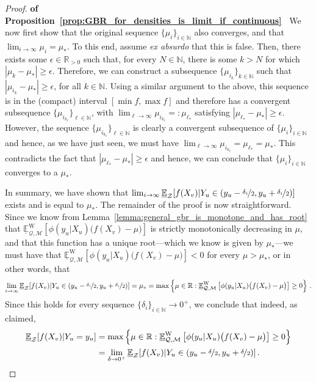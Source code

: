 \documentclass[twoside,11pt]{article}
\newcommand{\nats}{\mathbb{N}}
\newcommand{\reals}{\mathbb{R}}
\newcommand{\realspos}{\reals_{>0}}
\newcommand{\lexp}{\underline{\mathbb{E}}_{\rateset,\mathcal{M}}^\mathrm{W}}
\newcommand{\rateset}{\mathcal{Q}}
\newcommand{\abs}[1]{\left\vert #1 \right\vert}
\begin{document}
\begin{proof}{\bf of Proposition~\ref{prop:GBR_for_densities_is_limit_if_continuous}~}
We now first show that the original sequence $\{\mu_i\}_{i\in\nats}$ also converges, and that $\lim_{i\to\infty}\mu_i = \mu_{*}$. To this end, assume \emph{ex absurdo} that this is false. Then, there exists some $\epsilon\in\realspos$ such that, for every $N\in\nats$, there is some $k>N$ for which $\abs{\mu_k - \mu_{*}} \geq \epsilon$. Therefore, we can construct a subsequence $\{\mu_{i_k}\}_{k\in\nats}$ such that $\abs{\mu_{i_k}-\mu_{*}}\geq \epsilon$, for all $k\in\nats$. Using a similar argument to the above, this sequence is in the (compact) interval $[\min f, \max f]$ and therefore has a convergent subsequence $\{\mu_{i_{k_\ell}}\}_{\ell\in\nats}$, with $\lim_{\ell\to\infty}\mu_{i_{k_\ell}} =: \mu_{\ell_*}$ satisfying $\abs{\mu_{\ell_*} - \mu_{*}}\geq\epsilon$. However, the sequence $\{\mu_{i_{k_\ell}}\}_{\ell\in\nats}$ is clearly a convergent subsequence of $\{\mu_i\}_{i\in\nats}$ and hence, as we have just seen, we must have $\lim_{\ell\to\infty}\mu_{i_{k_\ell}} = \mu_{\ell_*} = \mu_{*}$. This contradicts the fact that $\abs{\mu_{\ell_*} - \mu_{*}}\geq\epsilon$ and hence, we can conclude that $\{\mu_i\}_{i\in\nats}$ converges to a $\mu_*$.

In summary, we have shown that $\lim_{i\to \infty}\underline{\mathbb{E}}_\mathcal{Z}[f(X_v)\vert Y_u\in (y_u-\nicefrac{\delta_i}{2},y_u+\nicefrac{\delta_i}{2})]$ exists and is equal to $\mu_*$. The remainder of the proof is now straightforward. Since we know from Lemma~\ref{lemma:general_gbr_is_monotone_and_has_root} that $\lexp\left[ \phi(y_u\vert X_u)\bigl(f(X_v) -\mu \bigr)\right]$ is strictly monotonically decreasing in $\mu$, and that this function has a unique root---which we know is given by $\mu_*$---we must have that $\lexp\left[ \phi(y_u\vert X_u)\bigl(f(X_v) -\mu \bigr)\right] < 0$ for every $\mu>\mu_*$, 
or in other words, that
\begin{equation*}
\lim_{i\to \infty}\underline{\mathbb{E}}_\mathcal{Z}[f(X_v)\vert Y_u\in (y_u-\nicefrac{\delta_i}{2},y_u+\nicefrac{\delta_i}{2})] = \mu_* = \max\left\{ \mu\in\reals : \lexp\left[ \phi(y_u\vert X_u)\bigl(f(X_v) -\mu \bigr)\right] \geq 0\right\}\,.
\end{equation*}
Since this holds for every sequence $\{\delta_i\}_{i\in\nats}\to 0^+$, we conclude that indeed, as claimed,
\begin{align*}
 \underline{\mathbb{E}}_\mathcal{Z}[f(X_v)\vert Y_u=y_u] %
&= \max\left\{ \mu\in\reals : \lexp\left[ \phi(y_u\vert X_u)\bigl(f(X_v) -\mu \bigr)\right] \geq 0\right\} \\
 &= \lim_{\delta\to 0^+}\underline{\mathbb{E}}_\mathcal{Z}[f(X_v)\vert Y_u\in (y_u-\nicefrac{\delta}{2},y_u+\nicefrac{\delta}{2})] \,.
\end{align*}
\end{proof}
\end{document}
